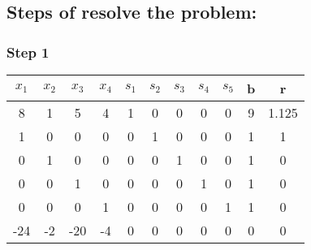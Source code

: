\documentclass{article}
\begin{document}
\subsection*{Steps of resolve the problem:}

\subsubsection*{Step 1}

\begin{center}
\begin{tabular}{|c|c|c|c|c|c|c|c|c|c|c|}
\hline
$x_1$  & $x_2$ & $x_3$  & $x_4$ & $s_1$ & $s_2$ & $s_3$ & $s_4$ & $s_5$ & b & r     \\ \hline
\cellcolor{pink!25}8   & 1  & 5   & 4  & 1  & 0  & 0  & 0  & 0  & 9 & 1.125 \\ \hline
\cellcolor{pink!25}1   & \cellcolor{yellow!25} 0  & \cellcolor{yellow!25} 0   & \cellcolor{yellow!25} 0  & \cellcolor{yellow!25} 0  & \cellcolor{yellow!25} 1  & \cellcolor{yellow!25} 0  & \cellcolor{yellow!25} 0  & \cellcolor{yellow!25} 0  & \cellcolor{yellow!25} 1 & 1\cellcolor{yellow!25}     \\ \hline
\cellcolor{pink!25}0   & 1  & 0   & 0  & 0  & 0  & 1  & 0  & 0  & 1 & 0     \\ \hline
\cellcolor{pink!25}0   & 0  & 1   & 0  & 0  & 0  & 0  & 1  & 0  & 1 & 0     \\ \hline
\cellcolor{pink!25}0   & 0  & 0   & 1  & 0  & 0  & 0  & 0  & 1  & 1 & 0     \\ \hline
\cellcolor{pink!25}-24 & -2 & -20 & -4 & 0  & 0  & 0  & 0  & 0  & 0 & 0     \\ \hline
\end{tabular}
\end{center}
\end{document}
